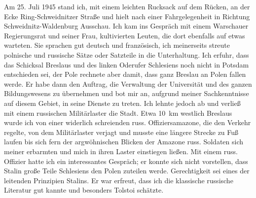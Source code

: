 Am 25. Juli 1945 stand ich, mit einem leichten Rucksack auf dem Rücken, an der Ecke Ring-Schweidnitzer Straße und hielt nach einer Fahrgelegenheit in Richtung Schweidnitz-Waldenburg Ausschau. Ich kam ins Gespräch mit einem Warschauer Regierungsrat und seiner Frau, kultivierten Leuten, die dort ebenfalls auf etwas warteten. Sie sprachen gut deutsch und französisch, ich meinerseits streute polnische und russische Sätze oder Satzteile in die Unterhaltung. Ich erfuhr, dass das Schicksal Breslaus und des linken Oderufer Schlesiens noch nicht in Potsdam entschieden sei, der Pole rechnete aber damit, dass ganz Breslau an Polen fallen werde. Er habe dann den Auftrag, die Verwaltung der Universität und des ganzen Bildungswesens zu übernehmen und bot mir an, aufgrund meiner Sachkenntnisse auf diesem Gebiet, in seine Dienste zu treten. Ich lehnte jedoch ab und verließ mit einem russischen Militärlaster die Stadt. Etwa 10~km westlich Breslaus wurde ich von einer widerlich schreienden russ. Offiziersamazone, die den Verkehr regelte, von dem Militärlaster verjagt und musste  eine längere Strecke zu Fuß laufen bis sich fern der argwöhnischen Blicken der Amazone russ. Soldaten sich meiner erbarmten und mich in ihren Laster einstiegen ließen. Mit einem russ. Offizier hatte ich ein interessantes Gespräch; er konnte sich nicht vorstellen, dass Stalin große Teile Schlesiens den Polen zuteilen werde. Gerechtigkeit sei eines der leitenden Prinzipien Stalins. Er war erfreut, dass ich die klassische russische Literatur gut kannte und besonders Tolstoi schätzte.

